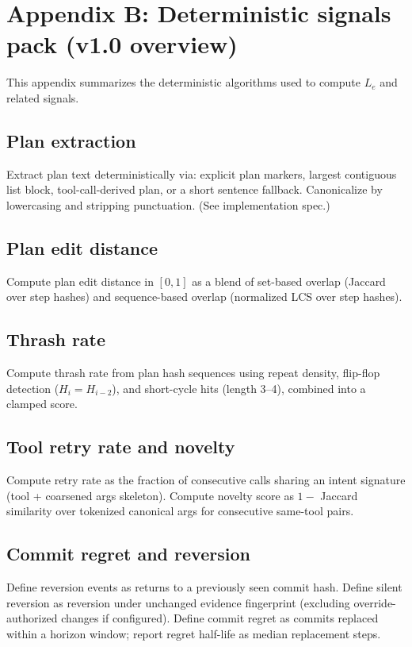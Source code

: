 \documentclass[11pt]{article}
\begin{document}
\section{Appendix B: Deterministic signals pack (v1.0 overview)}
This appendix summarizes the deterministic algorithms used to compute $L_e$ and related signals.

\subsection{Plan extraction}
Extract plan text deterministically via: explicit plan markers, largest contiguous list block, tool-call-derived
plan, or a short sentence fallback. Canonicalize by lowercasing and stripping punctuation. (See implementation spec.)

\subsection{Plan edit distance}
Compute plan edit distance in $[0,1]$ as a blend of set-based overlap (Jaccard over step hashes) and
sequence-based overlap (normalized LCS over step hashes).

\subsection{Thrash rate}
Compute thrash rate from plan hash sequences using repeat density, flip-flop detection ($H_i = H_{i-2}$),
and short-cycle hits (length 3--4), combined into a clamped score.

\subsection{Tool retry rate and novelty}
Compute retry rate as the fraction of consecutive calls sharing an intent signature (tool + coarsened args
skeleton). Compute novelty score as $1 -$ Jaccard similarity over tokenized canonical args for consecutive
same-tool pairs.

\subsection{Commit regret and reversion}
Define reversion events as returns to a previously seen commit hash. Define silent reversion as reversion
under unchanged evidence fingerprint (excluding override-authorized changes if configured). Define commit
regret as commits replaced within a horizon window; report regret half-life as median replacement steps.
\end{document}
